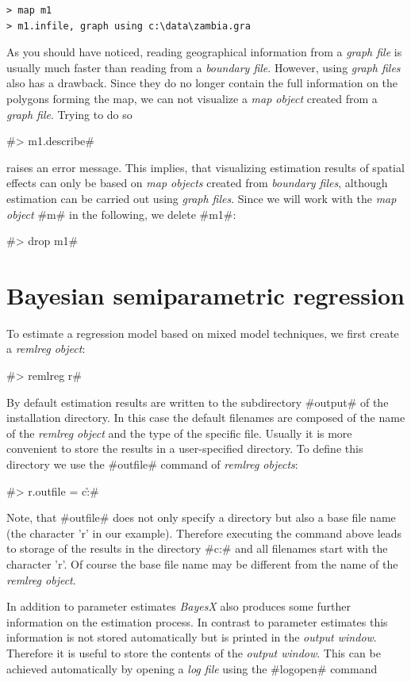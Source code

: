 \documentclass[11pt,a4paper,twoside]{bayesxreport}
\begin{document}
\begin{verbatim}
> map m1
> m1.infile, graph using c:\data\zambia.gra
\end{verbatim}

As you should have noticed, reading geographical information from a
{\it graph file} is usually much faster than reading from a {\it
boundary file}. However, using {\it graph files} also has a
drawback. Since they do no longer contain the full information on
the polygons forming the map, we can not visualize a {\it map
object} created from a {\it graph file}. Trying to do so

#> m1.describe#

raises an error message. This implies, that visualizing estimation
results of spatial effects can only be based on {\it map objects}
created from {\it boundary files}, although estimation can be
carried out using {\it graph files}. Since we will work with the
{\it map object} #m# in the following, we delete #m1#:

#> drop m1#

\section{Bayesian semiparametric
regression}\label{zambia_reml_regression}

To estimate a regression model based on mixed model techniques, we
first create a {\it remlreg object}:

#> remlreg r#

By default estimation results are written to the subdirectory
#output# of the installation directory. In this case the default
filenames are composed of the name of the {\it remlreg object} and
the type of the specific file. Usually it is more convenient to
store the results in a user-specified directory. To define this
directory we use the #outfile# command of {\it remlreg objects}:

#> r.outfile = c:\data\r#

Note, that #outfile# does not only specify a directory but also a
base file name (the character 'r' in our example). Therefore
executing the command above leads to storage of the results in the
directory #c:\data# and all filenames start with the character 'r'.
Of course the base file name may be different from the name of the
{\it remlreg object}.

In addition to parameter estimates {\it BayesX} also produces some
further information on the estimation process. In contrast to
parameter estimates this information is not stored automatically but
is printed in the {\it output window}. Therefore it is useful to
store the contents of the {\it output window}. This can be achieved
automatically by opening a {\it log file} using the #logopen#
command
\end{document}
